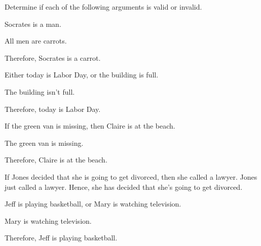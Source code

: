 
\practiceproblems
\problempart
Determine if each of the following arguments is valid or invalid.

\begin{enumerate}[(1)] %
\item 
\begin{earg}
\item Socrates is a man.
\item All men are carrots.
\item Therefore, Socrates is a carrot.
\end{earg}

\item
\begin{earg}
\item Either today is Labor Day, or the building is full.
\item The building isn’t full.
\item Therefore, today is Labor Day.
\end{earg}
\smallskip

\noindent\begin{minipage}{0.99\textwidth}
\item
\begin{earg}
\item If the green van is missing, then Claire is at the beach.
\item The green van is missing.
\item Therefore, Claire is at the beach.
\end{earg}
\end{minipage}

\item\begin{earg}
\item[] If Jones decided that she is going to get divorced, then she called a lawyer. Jones just called a lawyer. Hence, she has decided that she’s going to get divorced. 
\end{earg}

\item\begin{earg}
\item Jeff is playing basketball, or Mary is watching television.
\item Mary is watching television.
\item Therefore, Jeff is playing basketball.
\end{earg}


\end{enumerate}
